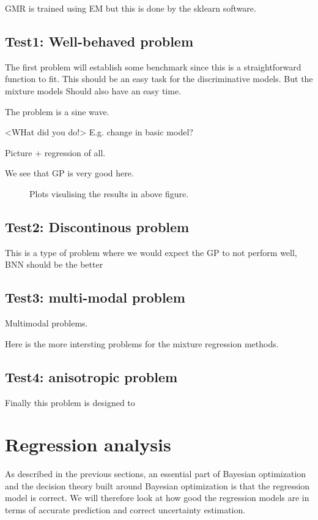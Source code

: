 GMR is trained using EM but this is done by the sklearn software. 

\subsection{Test1: Well-behaved problem}
The first problem will establish some benchmark since this is a straightforward function
to fit. This should be an easy task for the discriminative models. But the mixture models
Should also have an easy time. 

The problem is a sine wave. 

<WHat did you do!> E.g. change in basic model?

Picture + regression of all. 

We see that GP is very good here. 

\begin{figure}
  \caption{Plots visulising the results in above figure.}
\end{figure}



\subsection{Test2: Discontinous problem}
This is a type of problem where we would expect the GP to not perform well, 
BNN should be the better 


\subsection{Test3: multi-modal problem}
Multimodal problems. 

Here is the more intersting problems for the mixture regression methods. 




\subsection{Test4: anisotropic problem}
Finally this problem is designed to



\section{Regression analysis}
As described in the previous sections, an essential part of Bayesian optimization and the decision
theory built around Bayesian optimization is that the regression model is correct. We will therefore
look at how good the regression models are in terms of accurate prediction and 
correct uncertainty estimation. 

